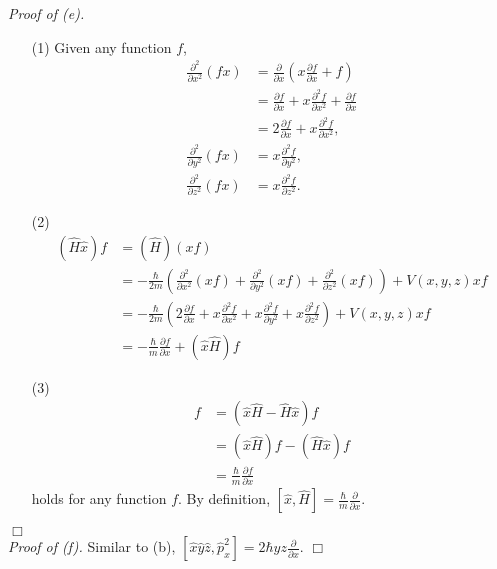 \documentclass{article}
\begin{document}
\emph{Proof of (e).}
\begin{enumerate}
\item[(1)]
Given any function $f$,
\begin{align*}
\frac{\partial^2}{\partial x^2}(fx)
&= \frac{\partial}{\partial x}\left( x\frac{\partial f}{\partial x} + f \right) \\
&= \frac{\partial f}{\partial x} + x\frac{\partial^2 f}{\partial x^2}
  + \frac{\partial f}{\partial x} \\
&= 2\frac{\partial f}{\partial x} + x\frac{\partial^2 f}{\partial x^2}, \\
\frac{\partial^2}{\partial y^2}(fx)
&= x \frac{\partial^2 f}{\partial y^2}, \\
\frac{\partial^2}{\partial z^2}(fx)
&= x \frac{\partial^2 f}{\partial z^2}.
\end{align*}
\item[(2)]
\begin{align*}
(\hat{H}\hat{x})f
&= (\hat{H})(xf) \\
&= -\frac{\hbar}{2m}
    \left(
      \frac{\partial^2}{\partial x^2}(xf)
      + \frac{\partial^2}{\partial y^2}(xf)
      + \frac{\partial^2}{\partial z^2}(xf)
    \right) + V(x,y,z)xf \\
&= -\frac{\hbar}{2m}
    \left(
      2 \frac{\partial f}{\partial x} + x\frac{\partial^2 f}{\partial x^2}
      + x \frac{\partial^2 f}{\partial y^2}
      + x \frac{\partial^2 f}{\partial z^2}
    \right) + V(x,y,z)xf \\
&= -\frac{\hbar}{m} \frac{\partial f}{\partial x} + (\hat{x}\hat{H})f
\end{align*}
\item[(3)]
\begin{align*}
[\hat{x}, \hat{H}]f
&= (\hat{x}\hat{H} - \hat{H} \hat{x})f \\
&= (\hat{x}\hat{H})f - (\hat{H}\hat{x})f \\
&= \frac{\hbar}{m} \frac{\partial f}{\partial x}
\end{align*}
holds for any function $f$.
By definition,
$[\hat{x}, \hat{H}] = \frac{\hbar}{m} \frac{\partial}{\partial x}$.
\end{enumerate}
$\Box$ \\

\emph{Proof of (f).}
Similar to (b),
$[\hat{x}\hat{y}\hat{z}, \hat{p}_x^2] = 2 \hbar yz \frac{\partial}{\partial x}$.
$\Box$ \\\\



\end{document}
